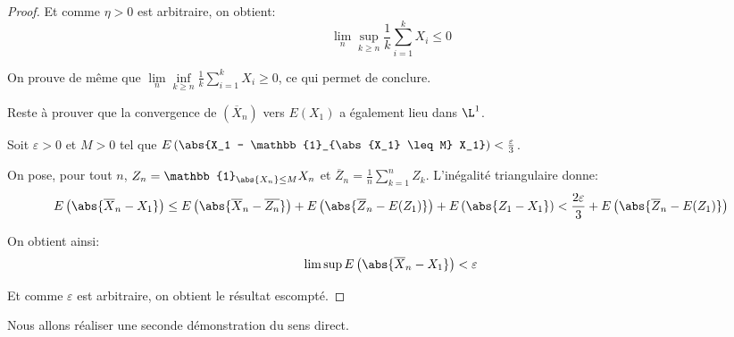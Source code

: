 \begin{proof}
Et comme $\eta>0$ est arbitraire, on obtient:
\[
\lim  \limits_{n} \sup \limits_{k \geq n} \frac{1}{k} \displaystyle{\sum_{i=1}^k} X_i \leq 0
\]

On prouve de même que $\lim  \limits_{n} \inf \limits_{k \geq n} \frac{1}{k} \displaystyle{\sum_{i=1}^k} X_i \geq 0$, ce qui permet de conclure.

\medskip
Reste à prouver que la convergence de $\left (\overline{X}_n\right )$ vers $E(X_1)$ a également lieu dans $\L^1$.

\medskip
Soit $\varepsilon>0$ et $M>0$ tel que $E\left ( \abs{X_1 - \mathbb{1}_{\abs{X_1} \leq M} X_1} \right ) < \frac{\varepsilon}{3}$.

On pose, pour tout $n$, $Z_n = \mathbb{1}_{\abs{X_n} \leq M} X_n$ et $\overline{Z}_n = \frac{1}{n} \displaystyle{\sum_{k=1}^n} Z_k$. L'inégalité triangulaire donne:
\[
E\left ( \abs{\overline{X}_n - X_1}\right ) \leq E\left ( \abs{\overline{X}_n - \overline{Z_n}}\right ) + E\left ( \abs{\overline{Z}_n - E(Z_1)}\right ) + E\left ( \abs{Z_1 - X_1} \right ) < \frac{2 \varepsilon}{3} + E\left ( \abs{\overline{Z}_n - E(Z_1)}\right )
\]

On obtient ainsi:
\[
\lim \sup E\left ( \abs{\overline{X}_n - X_1}\right ) < \varepsilon
\]

Et comme $\varepsilon$ est arbitraire, on obtient le résultat escompté.
\end{proof}

Nous allons réaliser une seconde démonstration du sens direct.

